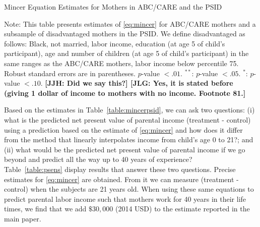 \begin{table}[H]
\begin{threeparttable}
\caption{Mincer Equation Estimates for Mothers in ABC/CARE and the PSID}
\label{table:mincerpsid}
\centering
\footnotesize

\begin{tablenotes}
\footnotesize
\item Note: This table presents estimates of \eqref{eq:mincer} for ABC/CARE mothers and a subsample of disadvantaged mothers in the PSID. We define disadvantaged as follows: Black, not married, labor income, education (at age 5 of child's participant), age and number of children (at age 5 of child's participant) in the same ranges as the ABC/CARE mothers, labor income below percentile 75. Robust standard errors are in parentheses. $p$-value $< .01$. $^{**}$: $p$-value $< .05$. $^{*}$: $p$-value $< .10$. \textbf{[JJH: Did we say this?] [JLG: Yes, it is stated before (giving 1 dollar of income to mothers with no income. Footnote 81.]}
\end{tablenotes}
\end{threeparttable}
\end{table}

\noindent Based on the estimates in Table~\ref{table:mincerpsid}, we can ask two questions: (i) what is the predicted net present value of parental income (treatment - control) using a prediction based on the estimate of \eqref{eq:mincer} and how does it differ from the method that linearly interpolates income from child's age 0 to 21?; and (ii) what would be the predicted net present value of parental income if we go beyond and predict all the way up to 40 years of experience?\\

\noindent Table~\ref{table:psens} display results that answer these two questions. Precise estimates for \eqref{eq:mincer} are obtained. From it we can measure (treatment - control) when the subjects are 21 years old. When using these same equations to predict parental labor income such that mothers work for 40 years in their life times, we find that we add $\$30,000$ (2014 USD) to the estimate reported in the main paper.

